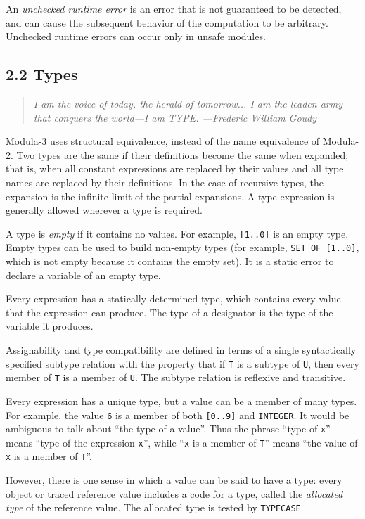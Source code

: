 \documentclass[10pt]{article}
\begin{document}
An \emph{unchecked runtime error} is an error that is not guaranteed to be
detected, and can cause the subsequent behavior of the computation to be
arbitrary.  Unchecked runtime errors can occur only in unsafe modules.

\subsection*{2.2 Types}

\begin{quote}
  \emph{I am the voice of today, the herald of tomorrow... I am the leaden
    army that conquers the world---I am TYPE.  ---Frederic William Goudy}
\end{quote}

Modula-3 uses structural equivalence, instead of the name equivalence of
Modula-2.  Two types are the same if their definitions become the same when
expanded; that is, when all constant expressions are replaced by their values
and all type names are replaced by their definitions.  In the case of recursive
types, the expansion is the infinite limit of the partial expansions.  A type
expression is generally allowed wherever a type is required.

A type is \emph{empty} if it contains no values.  For example, \verb|[1..0]|
is an empty type.  Empty types can be used to build non-empty types (for
example, \verb|SET OF [1..0]|, which is not empty because it contains the
empty set).  It is a static error to declare a variable of an empty type.

Every expression has a statically-determined type, which contains every value
that the expression can produce.  The type of a designator is the type of the
variable it produces.

Assignability and type compatibility are defined in terms of a single
syntactically specified subtype relation with the property that if \verb|T| is
a subtype of \verb|U|, then every member of \verb|T| is a member of \verb|U|.
The subtype relation is reflexive and transitive.

Every expression has a unique type, but a value can be a member of many types.
For example, the value \verb|6| is a member of both \verb|[0..9]| and
\verb|INTEGER|.  It would be ambiguous to talk about ``the type of a value''.
Thus the phrase ``type of \verb|x|'' means ``type of the expression
\verb|x|'', while ``\verb|x| is a member of \verb|T|'' means ``the value of
\verb|x| is a member of \verb|T|''.

However, there is one sense in which a value can be said to have a type: every
object or traced reference value includes a code for a type, called the
\emph{allocated type} of the reference value.  The allocated type is tested by
\verb|TYPECASE|.
\end{document}
